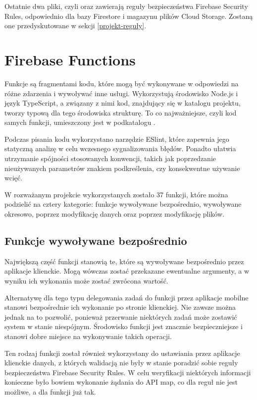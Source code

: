 Ostatnie dwa pliki, czyli  oraz  zawierają reguły bezpieczeństwa Firebase Security Rules, odpowiednio dla bazy Firestore i magazynu plików Cloud Storage. Zostaną one przedyskutowane w sekcji \ref{projekt-reguły}.

\section{Firebase Functions}
\label{projekt-funkcje}

Funkcje są fragmentami kodu, które mogą być wykonywane w odpowiedzi na różne zdarzenia i wywoływać inne usługi. Wykorzystują środowisko Node.js i język TypeScript, a związany z nimi kod, znajdujący się w katalogu  projektu, tworzy typową dla tego środowiska strukturę. To co najważniejsze, czyli kod samych funkcji, umieszczony jest w podkatalogu .

Podczas pisania kodu wykorzystano narzędzie ESlint, które zapewnia jego statyczną analizę w celu wczesnego sygnalizowania błędów. Ponadto ułatwia utrzymanie spójności stosowanych konwencji, takich jak poprzedzanie nieużywanych parametrów znakiem podkreślenia, czy konsekwentne używanie wcięć.

W rozważanym projekcie wykorzystanych zostało 37 funkcji, które można podzielić na cztery kategorie: funkcje wywoływane bezpośrednio, wywoływane okresowo, poprzez modyfikację danych oraz poprzez modyfikację plików. 

\subsection{Funkcje wywoływane bezpośrednio}

Największą część funkcji stanowią te, które są wywoływane bezpośrednio przez aplikacje klienckie. Mogą wówczas zostać przekazane ewentualne argumenty, a w wyniku ich wykonania może zostać zwrócona wartość.

Alternatywę dla tego typu delegowania zadań do funkcji przez aplikacje mobilne stanowi bezpośrednie ich wykonanie po stronie klienckiej. Nie zawsze można jednak na to pozwolić, ponieważ przerwanie niektórych zadań może zostawić system w stanie niespójnym. Środowisko funkcji jest znacznie bezpieczniejsze i stanowi dobre miejsce na wykonywanie takich operacji. 

Ten rodzaj funkcji został również wykorzystany do ustawiania przez aplikacje klienckie danych, z których walidacją nie były w stanie poradzić sobie reguły bezpieczeństwa Firebase Security Rules. W celu weryfikacji niektórych informacji konieczne było bowiem wykonanie żądania do API map, co dla reguł nie jest możliwe, a dla funkcji już tak. 

